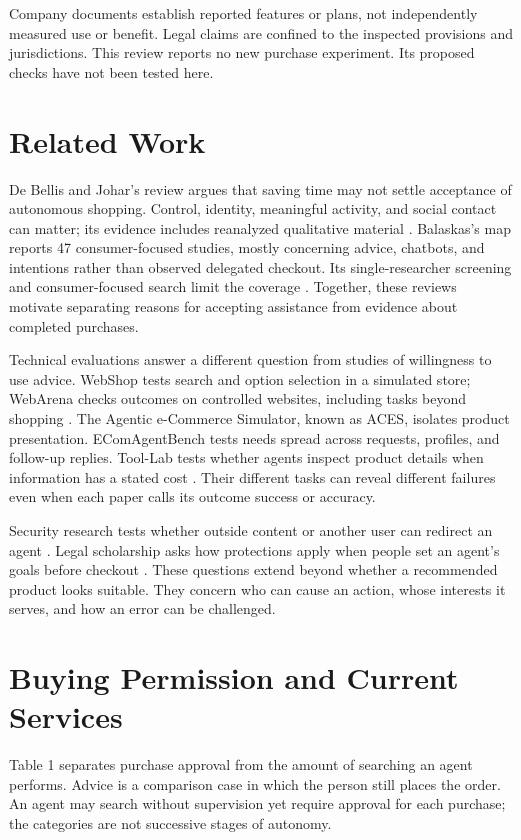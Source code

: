 \documentclass{article}
\begin{document}
Company documents establish reported features or plans, not independently measured use or benefit. Legal claims are confined to the inspected provisions and jurisdictions. This review reports no new purchase experiment. Its proposed checks have not been tested here.

\section{Related Work}

De Bellis and Johar's review argues that saving time may not settle acceptance of autonomous shopping. Control, identity, meaningful activity, and social contact can matter; its evidence includes reanalyzed qualitative material \cite{ref32}. Balaskas's map reports 47 consumer-focused studies, mostly concerning advice, chatbots, and intentions rather than observed delegated checkout. Its single-researcher screening and consumer-focused search limit the coverage \cite{ref39}. Together, these reviews motivate separating reasons for accepting assistance from evidence about completed purchases.

Technical evaluations answer a different question from studies of willingness to use advice. WebShop tests search and option selection in a simulated store; WebArena checks outcomes on controlled websites, including tasks beyond shopping \cite{ref33,ref34}. The Agentic e-Commerce Simulator, known as ACES, isolates product presentation. EComAgentBench tests needs spread across requests, profiles, and follow-up replies. Tool-Lab tests whether agents inspect product details when information has a stated cost \cite{ref17,ref18,ref19}. Their different tasks can reveal different failures even when each paper calls its outcome success or accuracy.

Security research tests whether outside content or another user can redirect an agent \cite{ref37,ref38}. Legal scholarship asks how protections apply when people set an agent's goals before checkout \cite{ref40}. These questions extend beyond whether a recommended product looks suitable. They concern who can cause an action, whose interests it serves, and how an error can be challenged.

\section{Buying Permission and Current Services}

Table 1 separates purchase approval from the amount of searching an agent performs. Advice is a comparison case in which the person still places the order. An agent may search without supervision yet require approval for each purchase; the categories are not successive stages of autonomy.
\end{document}
